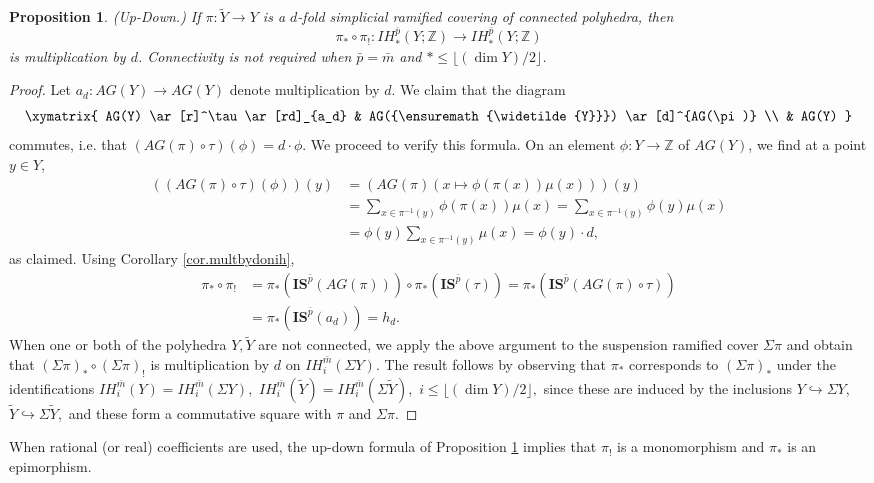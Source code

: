 \documentclass{amsart}
\newtheorem{prop}[thm]{Proposition}
\theoremstyle{definition}
\theoremstyle{remark}
\newcommand {\intg}  {\ensuremath{\mathbb{Z}}}
\newcommand {\bp}    {{\ensuremath{\bar{p}}}}
\newcommand {\bm}    {{\ensuremath{\bar{m}}}}
\newcommand {\wY}    {{\ensuremath{\widetilde{Y}}}}
\newcommand {\sIS}   {\mathbf{IS}}
\begin{document}
\begin{prop} \label{prop.updownmultbydegree}
(Up-Down.)
If $\pi: \wY \to Y$ is a $d$-fold simplicial ramified covering of connected polyhedra, then
\[   \pi_* \circ \pi_!: IH^\bp_* (Y;\intg) \longrightarrow IH^\bp_* (Y;\intg) \]
is multiplication by $d$.
Connectivity is not required when
$\bp = \bm$ and $* \leq \lfloor (\dim Y)/2 \rfloor$.
\end{prop}
\begin{proof}
Let $a_d: AG(Y) \to AG(Y)$ denote multiplication by $d$.
We claim that the diagram
\[ \xymatrix{
AG(Y) \ar[r]^\tau \ar[rd]_{a_d} & AG(\wY) \ar[d]^{AG(\pi)} \\
 & AG(Y)
} \]
commutes, i.e. that
$(AG(\pi) \circ \tau)(\phi) = d\cdot \phi.$
We proceed to verify this formula.
On an element $\phi: Y \to \intg$ of $AG(Y)$, we find at a point $y\in Y$,
\begin{align*}
((AG(\pi) \circ \tau)(\phi))(y)
&= (AG(\pi)(x \mapsto \phi (\pi (x)) \mu (x)))  (y) \\
&= \sum_{x \in \pi^{-1}(y)} \phi (\pi (x)) \mu (x) 
    = \sum_{x \in \pi^{-1}(y)} \phi (y) \mu (x) \\
&= \phi (y) \sum_{x \in \pi^{-1}(y)} \mu (x) 
   = \phi (y)\cdot d,
\end{align*}
as claimed.
Using Corollary \ref{cor.multbydonih},
\begin{align*}
\pi_* \circ \pi_!
&= \pi_* (\sIS^\bp (AG(\pi))) \circ \pi_* (\sIS^\bp (\tau)) 
   = \pi_* (\sIS^\bp (AG(\pi) \circ \tau)) \\
&= \pi_* (\sIS^\bp (a_d)) 
   = h_d.
\end{align*}
When one or both of the polyhedra $Y,\wY$ are not connected,
we apply the above argument to the suspension ramified cover 
$\Sigma \pi$ and obtain that $(\Sigma \pi)_* \circ (\Sigma \pi)_!$
is multiplication by $d$ on $IH^\bm_i (\Sigma Y)$. The result follows
by observing that $\pi_*$ corresponds to $(\Sigma \pi)_*$
under the identifications $IH^\bm_i (Y) = IH^\bm_i (\Sigma Y),$
$IH^\bm_i (\wY) = IH^\bm_i (\Sigma \wY),$
$i \leq \lfloor (\dim Y)/2 \rfloor,$ since these are induced by the
inclusions $Y \hookrightarrow \Sigma Y$,
$\wY \hookrightarrow \Sigma \wY,$ and these form a commutative
square with $\pi$ and $\Sigma \pi$.
\end{proof}
When rational (or real) coefficients are used,
the up-down formula of Proposition \ref{prop.updownmultbydegree}
implies that $\pi_!$ is a monomorphism and $\pi_*$ is an 
epimorphism.
\end{document}
